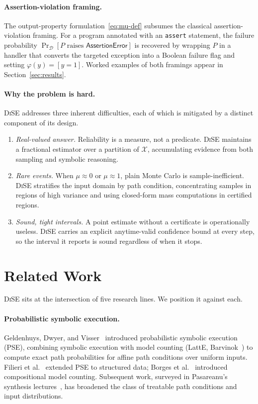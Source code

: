 \documentclass[runningheads]{llncs}
\providecommand{\Cref}[1]{Section~\ref{#1}}
\newcommand{\inX}{\mathcal{X}}
\newcommand{\dist}{\mathcal{D}}
\newcommand{\prog}{P}
\newcommand{\prop}{\varphi}
\newcommand{\mutrue}{\mu}
\newcommand{\toolname}{\textsc{DiSE}}
\newcommand{\code}[1]{\texttt{#1}}
\begin{document}
\paragraph{Assertion-violation framing.}
The output-property formulation~\eqref{eq:mu-def} subsumes the
classical assertion-violation framing.  For a program annotated with
an \code{assert} statement, the failure probability
$\Pr_\dist[\prog\text{ raises }\mathsf{AssertionError}]$ is recovered
by wrapping $\prog$ in a handler that converts the targeted exception
into a Boolean failure flag and setting $\prop(y) = [y = 1]$.
Worked examples of both framings appear in \Cref{sec:results}.

\paragraph{Why the problem is hard.}
\toolname{} addresses three inherent difficulties, each of which is
mitigated by a distinct component of its design.
\begin{enumerate}
\item \emph{Real-valued answer.}  Reliability is a measure, not a
  predicate.  \toolname{} maintains a fractional estimator over a
  partition of $\inX$, accumulating evidence from both sampling and
  symbolic reasoning.
\item \emph{Rare events.}  When $\mutrue \approx 0$ or $\mutrue
  \approx 1$, plain Monte Carlo is sample-inefficient.  \toolname{}
  stratifies the input domain by path condition, concentrating samples
  in regions of high variance and using closed-form mass computations
  in certified regions.
\item \emph{Sound, tight intervals.}  A point estimate without a
  certificate is operationally useless.  \toolname{} carries an
  explicit anytime-valid confidence bound at every step, so the
  interval it reports is sound regardless of when it stops.
\end{enumerate}

\section{Related Work}\label{sec:related}

\toolname{} sits at the intersection of five research lines.  We
position it against each.

\paragraph{Probabilistic symbolic execution.}
Geldenhuys, Dwyer, and Visser~\cite{geldenhuys2012pse} introduced
probabilistic symbolic execution (PSE), combining symbolic execution
with model counting (LattE, Barvinok~\cite{koppe2008barvinok}) to
compute exact path probabilities for affine path conditions over
uniform inputs.  Filieri et al.~\cite{filieri2015tacas} extended PSE
to structured data; Borges et al.~\cite{borges2014compositional}
introduced compositional model counting.  Subsequent work, surveyed in
Pasareanu's synthesis lectures~\cite{pasareanu2022lecture}, has
broadened the class of treatable path conditions and input
distributions.
\end{document}
